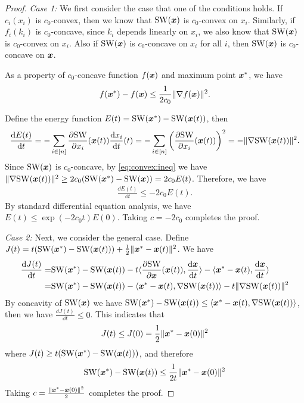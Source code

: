 \begin{proof}
\label{prf:thm:SW:BRD}
\emph{Case 1:}
We first consider the case that one of the conditions holds. If $c_i(x_i)$ is $c_0$-convex, then we know that $\mathrm{SW}({\bm{x}})$ is $c_0$-convex on $x_i$. Similarly, if $f_i(k_i)$ is $c_0$-concave, since $k_i$ depends linearly on $x_i$, we also know that $\mathrm{SW}({\bm{x}})$ is $c_0$-convex on $x_i$. Also if $\mathrm{SW}({\bm{x}})$ is $c_0$-concave on $x_i$ for all $i$, then $\mathrm{SW}({\bm{x}})$ is $c_0$-concave on ${\bm{x}}$. 

As a property of $c_0$-concave function $f({\bm{x}})$ and maximum point ${\bm{x}}^*$, we have
\begin{equation}
\label{eq:convex:ineq}
    f({\bm{x}}^*) - f({\bm{x}}) \le \frac{1}{2c_0} \|\nabla f({\bm{x}})\|^2.
\end{equation}

Define the energy function $E(t) = \mathrm{SW}({\bm{x}}^*) - \mathrm{SW}({\bm{x}}(t))$, then 
\begin{align*}
    \frac{\mathrm{d} E(t)}{\mathrm{d} t} =-\sum_{i\in[n]} \frac{\partial \mathrm{SW}}{\partial x_i}({\bm{x}}(t)) \frac{\mathrm{d} x_i}{\mathrm{d} t}(t)
    = -\sum_{i\in[n]} \left(\frac{\partial \mathrm{SW}}{\partial x_i}({\bm{x}}(t))\right)^2 = -\|\nabla \mathrm{SW}({\bm{x}}(t))\|^2.
\end{align*}
Since $\mathrm{SW}({\bm{x}})$ is $c_0$-concave, by \cref*{eq:convex:ineq} we have $\|\nabla \mathrm{SW}({\bm{x}}(t))\|^2 \ge 2c_0 (\mathrm{SW}({\bm{x}}^*) - \mathrm{SW}({\bm{x}})) = 2c_0 E(t)$. Therefore, we have
\begin{align*}
    \frac{\dd E(t)}{\dd t} \le -2c_0 E(t).
\end{align*}
By standard differential equation analysis, we have $E(t) \le \exp(-2c_0 t)E(0)$. Taking $c = -2c_0$ completes the proof.

\emph{Case 2:}
Next, we consider the general case. Define $J(t) = t(\mathrm{SW}({\bm{x}}^*) - \mathrm{SW}({\bm{x}}(t))) + \frac{1}{2}\| {\bm{x}}^* - {\bm{x}}(t) \|^2$. We have
\begin{align*}
    \frac{\mathrm{d} J(t)}{\mathrm{d} t} =& \mathrm{SW}({\bm{x}}^*) - \mathrm{SW}({\bm{x}}(t))  - t \langle \frac{\partial \mathrm{SW}}{\partial {\bm{x}}}({\bm{x}}(t)), \frac{\mathrm{d} {\bm{x}}}{\mathrm{d} t}\rangle - \langle {\bm{x}}^* - {\bm{x}}(t), \frac{\mathrm{d} {\bm{x}}}{\mathrm{d} t}\rangle
    \\
    =& \mathrm{SW}({\bm{x}}^*) - \mathrm{SW}({\bm{x}}(t)) - \langle {\bm{x}}^* - {\bm{x}}(t), \nabla \mathrm{SW}({\bm{x}}(t))\rangle - t \|\nabla \mathrm{SW}({\bm{x}}(t))\|^2
\end{align*}
By concavity of $\mathrm{SW}({\bm{x}})$ we have $\mathrm{SW}({\bm{x}}^*) - \mathrm{SW}({\bm{x}}(t)) \le \langle {\bm{x}}^* - {\bm{x}}(t), \nabla \mathrm{SW}({\bm{x}}(t))\rangle$, then we have $\frac{\dd J(t)}{\dd t} \le 0$. This indicates that
\begin{align*}
    J(t) \le J(0) = \frac{1}{2}\| {\bm{x}}^* - {\bm{x}}(0) \|^2
\end{align*}
where $J(t) \ge t(\mathrm{SW}({\bm{x}}^*) - \mathrm{SW}({\bm{x}}(t)))$, and therefore
\begin{align*}
    \mathrm{SW}({\bm{x}}^*) - \mathrm{SW}({\bm{x}}(t)) \le \frac{1}{2t}\| {\bm{x}}^* - {\bm{x}}(0) \|^2
\end{align*}
Taking $c = \frac{\| {\bm{x}}^* - {\bm{x}}(0) \|^2}{2}$ completes the proof.

\end{proof}